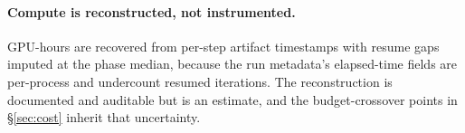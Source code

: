 \paragraph{Compute is reconstructed, not instrumented.}
GPU-hours are recovered from per-step artifact timestamps with resume gaps imputed at the phase
median, because the run metadata's elapsed-time fields are per-process and undercount resumed
iterations. The reconstruction is documented and auditable but is an estimate, and the
budget-crossover points in \S\ref{sec:cost} inherit that uncertainty.

